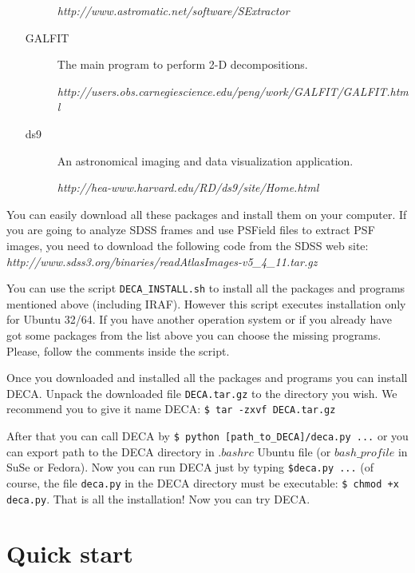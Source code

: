 \documentclass[
aps,%
12pt,%
final,%
notitlepage,%
oneside,%
onecolumn,%
nobibnotes,%
nofootinbib,%
superscriptaddress,%
noshowpacs,%
centertags]%
{revtex4}
\begin{document}
\begin{enumerate}
\begin{description}
   	\textit{http://www.astromatic.net/software/SExtractor}

   \item[GALFIT] The main program to perform 2-D decompositions.

   	\textit{http://users.obs.carnegiescience.edu/peng/work/GALFIT/GALFIT.html}

   \item[ds9] An astronomical imaging and data visualization application.

   	\textit{http://hea-www.harvard.edu/RD/ds9/site/Home.html}
  \end{description}
\end{enumerate}
You can easily download all these packages and install them on your computer. If you are going to analyze SDSS frames and use PSField files to extract PSF images, you need to download the following code from the SDSS web site:
	\textit{http://www.sdss3.org/binaries/readAtlasImages-v5\_4\_11.tar.gz}
	

You can use the script \texttt{DECA\_INSTALL.sh} to install all the packages and programs mentioned above (including IRAF). However this script executes installation only for Ubuntu 32/64. If you have another operation system or if you already have got some packages from the list above you can choose the missing programs. Please, follow the comments inside the script.

Once you downloaded and installed all the packages and programs you can install DECA. Unpack the downloaded file \texttt{DECA.tar.gz} to the directory you wish. We recommend you to give it name DECA:
	\texttt{\$ tar -zxvf DECA.tar.gz}

After that you can call DECA by \texttt{\$ python [path\_to\_DECA]/deca.py ...} or you can export path to the DECA directory in $.bashrc$ Ubuntu file (or $bash\_profile$ in SuSe or Fedora). Now you can run DECA just by typing \texttt{\$deca.py ...} (of course, the file \texttt{deca.py} in the DECA directory must be executable: \texttt{\$ chmod +x deca.py}. That is all the installation! Now you can try DECA.


\section{Quick start}
\end{document}
